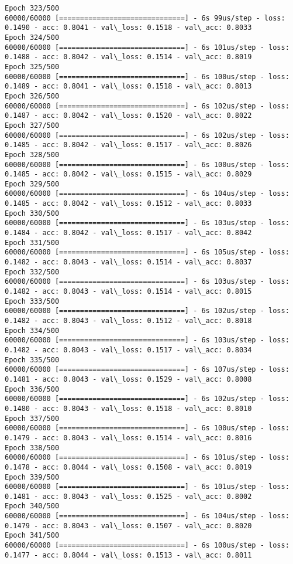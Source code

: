 \documentclass[11pt]{article}
\begin{document}
\begin{Verbatim}[commandchars=\\\{\}]
Epoch 323/500
60000/60000 [==============================] - 6s 99us/step - loss: 0.1490 - acc: 0.8041 - val\_loss: 0.1518 - val\_acc: 0.8033
Epoch 324/500
60000/60000 [==============================] - 6s 101us/step - loss: 0.1488 - acc: 0.8042 - val\_loss: 0.1514 - val\_acc: 0.8019
Epoch 325/500
60000/60000 [==============================] - 6s 100us/step - loss: 0.1489 - acc: 0.8041 - val\_loss: 0.1518 - val\_acc: 0.8013
Epoch 326/500
60000/60000 [==============================] - 6s 102us/step - loss: 0.1487 - acc: 0.8042 - val\_loss: 0.1520 - val\_acc: 0.8022
Epoch 327/500
60000/60000 [==============================] - 6s 102us/step - loss: 0.1485 - acc: 0.8042 - val\_loss: 0.1517 - val\_acc: 0.8026
Epoch 328/500
60000/60000 [==============================] - 6s 100us/step - loss: 0.1485 - acc: 0.8042 - val\_loss: 0.1515 - val\_acc: 0.8029
Epoch 329/500
60000/60000 [==============================] - 6s 104us/step - loss: 0.1485 - acc: 0.8042 - val\_loss: 0.1512 - val\_acc: 0.8033
Epoch 330/500
60000/60000 [==============================] - 6s 103us/step - loss: 0.1484 - acc: 0.8042 - val\_loss: 0.1517 - val\_acc: 0.8042
Epoch 331/500
60000/60000 [==============================] - 6s 105us/step - loss: 0.1482 - acc: 0.8043 - val\_loss: 0.1514 - val\_acc: 0.8037
Epoch 332/500
60000/60000 [==============================] - 6s 103us/step - loss: 0.1482 - acc: 0.8043 - val\_loss: 0.1514 - val\_acc: 0.8015
Epoch 333/500
60000/60000 [==============================] - 6s 102us/step - loss: 0.1482 - acc: 0.8043 - val\_loss: 0.1512 - val\_acc: 0.8018
Epoch 334/500
60000/60000 [==============================] - 6s 103us/step - loss: 0.1482 - acc: 0.8043 - val\_loss: 0.1517 - val\_acc: 0.8034
Epoch 335/500
60000/60000 [==============================] - 6s 107us/step - loss: 0.1481 - acc: 0.8043 - val\_loss: 0.1529 - val\_acc: 0.8008
Epoch 336/500
60000/60000 [==============================] - 6s 102us/step - loss: 0.1480 - acc: 0.8043 - val\_loss: 0.1518 - val\_acc: 0.8010
Epoch 337/500
60000/60000 [==============================] - 6s 100us/step - loss: 0.1479 - acc: 0.8043 - val\_loss: 0.1514 - val\_acc: 0.8016
Epoch 338/500
60000/60000 [==============================] - 6s 101us/step - loss: 0.1478 - acc: 0.8044 - val\_loss: 0.1508 - val\_acc: 0.8019
Epoch 339/500
60000/60000 [==============================] - 6s 101us/step - loss: 0.1481 - acc: 0.8043 - val\_loss: 0.1525 - val\_acc: 0.8002
Epoch 340/500
60000/60000 [==============================] - 6s 104us/step - loss: 0.1479 - acc: 0.8043 - val\_loss: 0.1507 - val\_acc: 0.8020
Epoch 341/500
60000/60000 [==============================] - 6s 100us/step - loss: 0.1477 - acc: 0.8044 - val\_loss: 0.1513 - val\_acc: 0.8011

\end{Verbatim}
\end{document}
